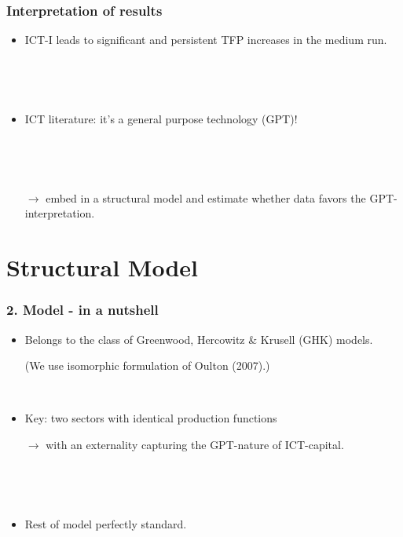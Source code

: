 \documentclass{beamer}
\begin{document}
\begin{frame}
	\frametitle{Interpretation of results}
	
	\begin{itemize}
	\item ICT-I leads to significant and persistent TFP increases in the medium run.
	
	\
	
	\
	
	\item ICT literature: it's a general purpose technology (GPT)!
	
	\
	
	\
	
	\item[$\rightarrow$] embed in a structural model and estimate whether data favors the GPT-interpretation.
	\end{itemize}

	
	
	
	

\end{frame}

\section{Structural Model}

\begin{frame}
	\frametitle{2. Model - in a nutshell}
	
	\begin{itemize}
	\item Belongs to the class of Greenwood, Hercowitz \& Krusell (GHK) models. 
	
	(We use isomorphic formulation of Oulton (2007).)
	
	\
	
	\item Key: two sectors with identical production functions
	\item[$\rightarrow$] with an externality capturing the GPT-nature of ICT-capital.
	
	\
	
	\
	
	\item	Rest of model perfectly standard.
	\end{itemize}
	

\end{frame}
\end{document}
